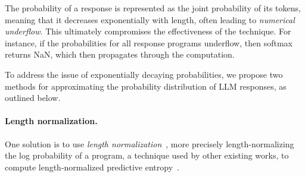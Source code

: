 The probability of a response is represented as the joint probability of its tokens, meaning that it decreases exponentially with length, often leading to \emph{numerical underflow}. 
This ultimately compromises the effectiveness of the technique. 
For instance, if the probabilities for all response programs underflow, then softmax returns NaN, which then propagates through the computation.

To address the issue of exponentially decaying probabilities, we propose two methods for approximating the probability distribution of LLM responses, as outlined below.

\paragraph{Length normalization.}



One solution is to use \emph{length normalization}~\cite{DBLP:conf/wmt/MurrayC18,DBLP:conf/aclnmt/KoehnK17}, more precisely length-normalizing the log probability of a program, a technique  used by other existing works, \eg to compute length-normalized predictive entropy~\cite{DBLP:conf/iclr/MalininG21}. %

